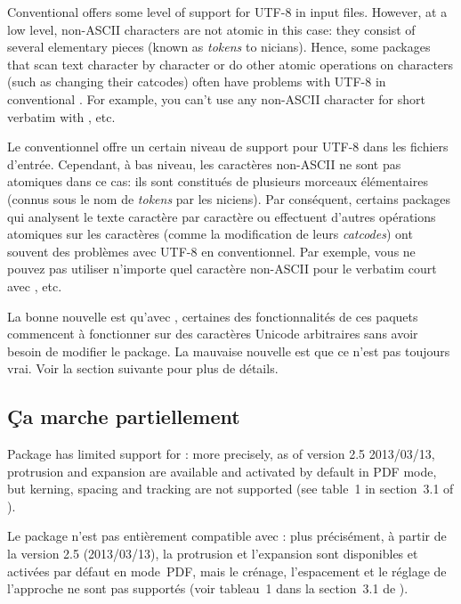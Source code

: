 \documentclass{lltxdoc}
\begin{document}
Conventional \latex offers some level of support for UTF-8 in input files.
However, at a low level, non-ASCII characters are not atomic in this case:
they consist of several elementary pieces (known as \emph{tokens} to
\tex{}nicians). Hence, some packages that scan text character by character or
do other atomic operations on characters (such as changing their catcodes)
often have problems with UTF-8 in conventional \latex. For example, you can't
use any non-ASCII character for short verbatim with , etc.

Le \latex conventionnel offre un certain niveau de support pour UTF-8 dans les fichiers d'entrée. Cependant, à bas niveau, les caractères non-ASCII ne sont pas atomiques dans ce cas: ils sont constitués de plusieurs morceaux élémentaires (connus sous le nom de \emph{tokens} par les \tex{}niciens). Par conséquent, certains packages qui analysent le texte caractère par caractère ou effectuent d'autres opérations atomiques sur les caractères (comme la modification de leurs \emph{catcodes}) ont souvent des problèmes avec UTF-8 en \latex conventionnel. Par exemple, vous ne pouvez pas utiliser n'importe quel caractère non-ASCII pour le verbatim court avec , etc.

La bonne nouvelle est qu'avec \lualatex, certaines des fonctionnalités de ces paquets
commencent à fonctionner sur des caractères Unicode arbitraires sans avoir besoin de
modifier le package. La mauvaise nouvelle est que ce n'est pas toujours vrai.
Voir la section suivante pour plus de détails.

\subsection{Ça marche partiellement}\label{partial}

Package  has limited support for \luatex: more precisely, as of
version 2.5 2013/03/13, protrusion and expansion are available and activated
by default in PDF mode, but kerning, spacing and tracking are not supported
(see table~1 in section~3.1 of ).

Le package  n'est pas entièrement compatible avec \luatex: plus précisément, à partir de la version 2.5 (2013/03/13), la protrusion et l'expansion sont disponibles et activées par défaut en mode~PDF, mais le crénage, l'espacement et le réglage de l'approche ne sont pas supportés (voir tableau~1 dans la section~3.1 de ).
\end{document}
